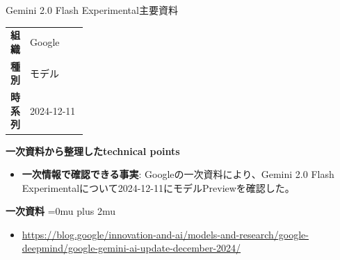 \begin{technicalnote}{Gemini 2.0 Flash Experimental}{主要資料}
\begingroup
\begin{tabularx}{\linewidth}{@{}>{\bfseries}p{0.22\linewidth}X@{}}
組織 & Google \\
種別 & モデル \\
時系列 & 2024-12-11 \\
\end{tabularx}
\smallskip
{\bfseries 一次資料から整理したtechnical points}
\begin{itemize}[leftmargin=1.5em,itemsep=0.35em]
\item \textbf{一次情報で確認できる事実}: Googleの一次資料により、Gemini 2.0 Flash Experimentalについて2024-12-11にモデルPreviewを確認した。
\end{itemize}
\begin{minipage}{\linewidth}
\begin{samepage}
{\bfseries 一次資料}
\begingroup\sloppy
\Urlmuskip=0mu plus 2mu\relax
\begin{itemize}[leftmargin=1.5em,itemsep=0.25em]
\item {\scriptsize\url{https://blog.google/innovation-and-ai/models-and-research/google-deepmind/google-gemini-ai-update-december-2024/}}
\end{itemize}
\endgroup
\end{samepage}
\end{minipage}
\endgroup
\end{technicalnote}
\medskip

